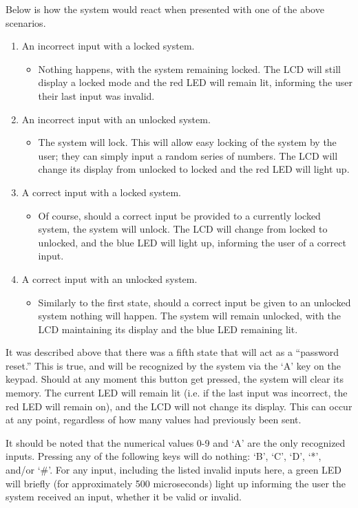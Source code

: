 \documentclass[10pt,a4paper]{article}
\begin{document}
	Below is how the system would react when presented with one of the above scenarios.
	\begin{enumerate}
		\item An incorrect input with a locked system.
		\begin{itemize}
			\item Nothing happens, with the system remaining locked. The LCD will still display a locked mode and the red LED will remain lit, informing the user their last input was invalid.
		\end{itemize}
		\item An incorrect input with an unlocked system. 
		\begin{itemize}
			\item The system will lock. This will allow easy locking of the system by the user; they can simply input a random series of numbers. The LCD will change its display from unlocked to locked and the red LED will light up.
		\end{itemize}
		\item A correct input with a locked system.
		\begin{itemize}
			\item Of course, should a correct input be provided to a currently locked system, the system will unlock. The LCD will change from locked to unlocked, and the blue LED will light up, informing the user of a correct input.
		\end{itemize}
		\item A correct input with an unlocked system.
		\begin{itemize}
			\item Similarly to the first state, should a correct input be given to an unlocked system nothing will happen. The system will remain unlocked, with the LCD maintaining its display and the blue LED remaining lit.
		\end{itemize}
	\end{enumerate}
	It was described above that there was a fifth state that will act as a ``password reset.'' This is true, and will be recognized by the system via the `A' key on the keypad. Should at any moment this button get pressed, the system will clear its memory. The current LED will remain lit (i.e. if the last input was incorrect, the red LED will remain on), and the LCD will not change its display. This can occur at any point, regardless of how many values had previously been sent. 
	
	It should be noted that the numerical values 0-9 and `A' are the only recognized inputs. Pressing any of the following keys will do nothing: `B', `C', `D', `*', and/or `\#'. For any input, including the listed invalid inputs here, a green LED will briefly (for approximately 500 microseconds) light up informing the user the system received an input, whether it be valid or invalid.
	
\end{document}
